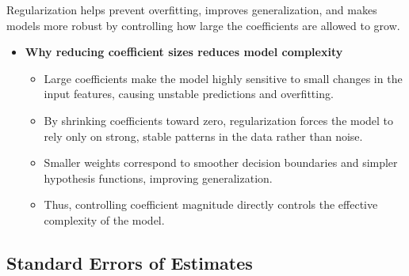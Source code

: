 \documentclass[11pt,a4paper]{article}
\begin{document}
Regularization helps prevent overfitting, improves generalization, and makes models more robust by controlling how large the coefficients are allowed to grow.
\newline
\begin{itemize}
    \item \textbf{Why reducing coefficient sizes reduces model complexity}  
    \begin{itemize}
        \item Large coefficients make the model highly sensitive to small changes in the input features, causing unstable predictions and overfitting.  
        \item By shrinking coefficients toward zero, regularization forces the model to rely only on strong, stable patterns in the data rather than noise.  
        \item Smaller weights correspond to smoother decision boundaries and simpler hypothesis functions, improving generalization.  
        \item Thus, controlling coefficient magnitude directly controls the effective complexity of the model.
    \end{itemize}
\end{itemize}

\subsection{Standard Errors of Estimates}
\end{document}
